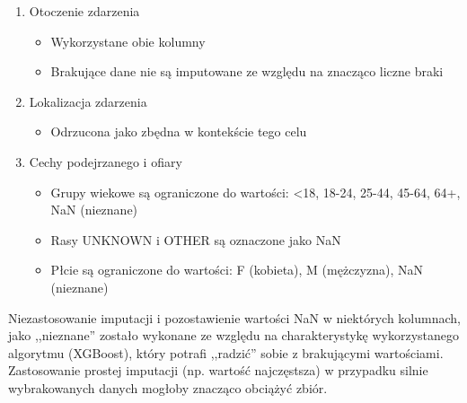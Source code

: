 \documentclass{classrep}
\begin{document}
{{{\begin{enumerate}
\begin{itemize}
                        \item Odrzucone jako zbędne w kontekście tego celu
                    \end{itemize}
                    \item Otoczenie zdarzenia
                    \begin{itemize}
                        \item Wykorzystane obie kolumny
                        \item Brakujące dane nie są imputowane ze względu na znacząco liczne braki
                    \end{itemize}
                    \item Lokalizacja zdarzenia
                    \begin{itemize}
                        \item Odrzucona jako zbędna w kontekście tego celu
                    \end{itemize}
                    \item Cechy podejrzanego i ofiary
                    \begin{itemize}
                        \item Grupy wiekowe są ograniczone do wartości: <18, 18-24, 25-44, 45-64, 64+, NaN (nieznane)
                        \item Rasy UNKNOWN i OTHER są oznaczone jako NaN
                        \item Płcie są ograniczone do wartości: F (kobieta), M (mężczyzna), NaN (nieznane)
                    \end{itemize}
                \end{enumerate}
                Niezastosowanie imputacji i pozostawienie wartości NaN w niektórych kolumnach, jako ,,nieznane'' zostało wykonane ze względu na charakterystykę wykorzystanego algorytmu (XGBoost), który potrafi ,,radzić'' sobie z brakującymi wartościami. Zastosowanie prostej imputacji (np. wartość najczęstsza) w przypadku silnie wybrakowanych danych mogłoby znacząco obciążyć zbiór.
                
}}}
\end{document}
